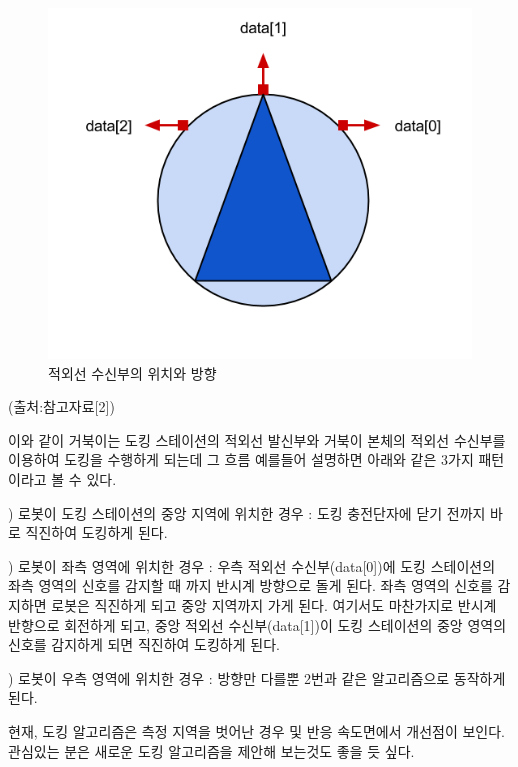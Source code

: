 \begin{figure}[h]
\centering\includegraphics[width=0.7\columnwidth]{pictures/chapter10/dock_ir.png}
\caption{적외선 수신부의 위치와 방향}
\end{figure}

(출처:참고자료[2])

이와 같이 거북이는 도킹 스테이션의 적외선 발신부와 거북이 본체의 적외선 수신부를 이용하여 도킹을 수행하게 되는데 그 흐름 예를들어 설명하면 아래와 같은 3가지 패턴이라고 볼 수 있다.


\setcounter{num}{0}

\vspace{\baselineskip}
\noindent
{}
\thenum) 로봇이 도킹 스테이션의 중앙 지역에 위치한 경우
:  도킹 충전단자에 닫기 전까지 바로 직진하여 도킹하게 된다.

\vspace{\baselineskip}
\noindent
{}
\thenum) 로봇이 좌측 영역에 위치한 경우
: 우측 적외선 수신부(data[0])에 도킹 스테이션의 좌측 영역의 신호를 감지할 때 까지 반시계 방향으로 돌게 된다. 좌측 영역의 신호를 감지하면 로봇은 직진하게 되고 중앙 지역까지 가게 된다. 여기서도 마찬가지로 반시계 반향으로 회전하게 되고, 중앙 적외선 수신부(data[1])이 도킹 스테이션의 중앙 영역의 신호를 감지하게 되면 직진하여 도킹하게 된다.

\vspace{\baselineskip}
\noindent
{}
\thenum) 로봇이 우측 영역에 위치한 경우
: 방향만 다를뿐 2번과 같은 알고리즘으로 동작하게 된다.

현재, 도킹 알고리즘은 측정  지역을 벗어난 경우 및 반응 속도면에서 개선점이 보인다. 관심있는 분은 새로운 도킹 알고리즘을 제안해 보는것도 좋을 듯 싶다.


